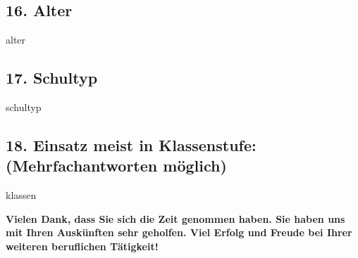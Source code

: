 \documentclass[a4paper,10pt]{article}
\begin{document}
{\subsection*{16. Alter}
\vspace{0.5cm}
\begin{questionmult}{alter}
	\begin{choices}
	\end{choices}
\end{questionmult}

\subsection*{17. Schultyp}
\vspace{0.5cm}
\begin{questionmult}{schultyp}
	\begin{choices}
		\scoring{b=1}
		\scoring{b=2}
		\scoring{b=3}
		\scoring{b=4}
		\scoring{b=5}
		\scoring{b=6}
	\end{choices}
\end{questionmult}

\subsection*{18. Einsatz meist in Klassenstufe: \\ (Mehrfachantworten möglich)}
\vspace{0.5cm}
\begin{questionmult}{klassen}
	\begin{choices}
	\end{choices}
\end{questionmult}


\bigskip

\begin{flushleft}
\textbf{Vielen Dank, dass Sie sich die Zeit genommen haben. Sie haben uns mit Ihren Auskünften sehr geholfen. Viel Erfolg und Freude bei Ihrer weiteren beruflichen Tätigkeit!}
\end{flushleft}

\newpage
\quad  %


}
\end{document}

